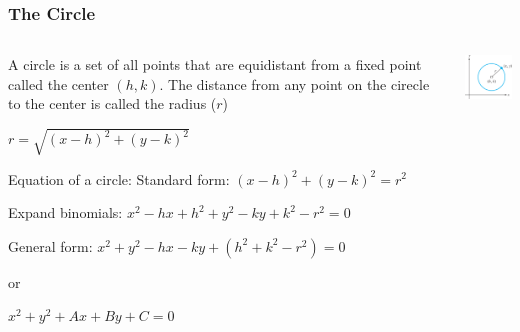 \documentclass{beamer}
\begin{document}
\begin{frame}\frametitle{The Circle}
\begin{columns}
\begin{column}{7.5cm}

A circle is a set of all points that are equidistant from a fixed point called the center $(h,k)$. The distance from any point on the cirecle to the center is called the radius ($r$)

$r = \sqrt{(x-h)^2 + (y-k)^2}$ \newline

Equation of a circle: \newline
Standard form: $(x-h)^2 + (y-k)^2 = r^2$ \newline

Expand binomials: $x^2-hx+h^2+y^2-ky+k^2 - r^2 = 0$ \newline

General form: $x^2+y^2-hx-ky+(h^2+k^2-r^2)=0$

\hspace*{10mm} or

$x^2 + y^2 + Ax + By + C = 0$

\end{column}
\begin{column}{3.5cm}
\begin{center}
\includegraphics[width=3cm]{fig/circle.png}
\end{center}
\end{column}
\end{columns}
\end{frame}
\end{document}
